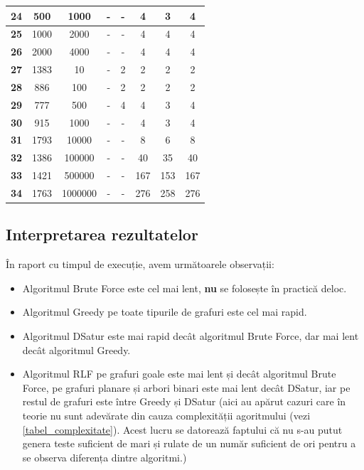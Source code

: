\documentclass[runningheads]{llncs}
\begin{document}
\begin{table}[!]
\begin{tabular}{|c|c|c|c|c|c|c|c|}
\textbf{24} & 500 & 1000 & - & - & 4 & 3 & 4 \\ \hline 
\textbf{25} & 1000 & 2000 & - & - & 4 & 4 & 4 \\ \hline 
\textbf{26} & 2000 & 4000 & - & - & 4 & 4 & 4 \\ \hline 
\textbf{27} & 1383 & 10 & - & 2 & 2 & 2 & 2 \\ \hline 
\textbf{28} & 886 & 100 & - & 2 & 2 & 2 & 2 \\ \hline 
\textbf{29} & 777 & 500 & - & 4 & 4 & 3 & 4 \\ \hline 
\textbf{30} & 915 & 1000 & - & - & 4 & 3 & 4 \\ \hline 
\textbf{31} & 1793 & 10000 & - & - & 8 & 6 & 8 \\ \hline 
\textbf{32} & 1386 & 100000 & - & - & 40 & 35 & 40 \\ \hline 
\textbf{33} & 1421 & 500000 & - & - & 167 & 153 & 167 \\ \hline 
\textbf{34} & 1763 & 1000000 & - & - & 276 & 258 & 276 \\ \hline 
\end{tabular}
\end{table}

\subsection{Interpretarea rezultatelor}
În raport cu timpul de execuție, avem următoarele observații:
\begin{itemize}
    \item Algoritmul Brute Force este cel mai lent, \textbf{nu} se folosește
    în practică deloc.
    \item Algoritmul Greedy pe toate tipurile de grafuri este cel mai rapid.
    \item Algoritmul DSatur este mai rapid decât algoritmul Brute Force, dar
    mai lent decât algoritmul Greedy.
    \item Algoritmul RLF pe grafuri goale este mai lent și decât algoritmul
    Brute Force, pe grafuri planare și arbori binari este mai lent decât DSatur, 
    iar pe restul de grafuri este între Greedy și DSatur (aici au apărut cazuri
    care în teorie nu sunt adevărate din cauza complexității agoritmului (vezi \ref{tabel_complexitate}).
    Acest lucru se datorează faptului că nu s-au putut genera teste suficient de
    mari și rulate de un număr suficient de ori pentru a se observa diferența dintre algoritmi.)

\end{itemize}
\end{document}
